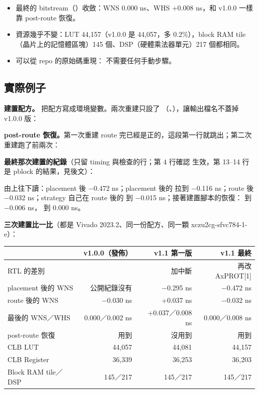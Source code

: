 \begin{gain}
\begin{itemize}
\item 最終的 bitstream（）收斂：WNS 0.000 ns、WHS +0.008 ns，和 v1.0.0 一樣靠 post-route 恢復。
\item 資源幾乎不變：LUT 44,157（v1.0.0 是 44,057，多 0.2\%），block RAM tile（晶片上的記憶體區塊）145 個、DSP（硬體乘法器單元）217 個都相同。
\item 可以從 repo 的原始碼重現： 不需要任何手動步驟。
\end{itemize}
\end{gain}

\subsection{實際例子}

\textbf{建置配方。} 把配方寫成環境變數。兩次重建只設了 （、），讓輸出檔名不蓋掉 v1.0.0 版：


\textbf{post-route 恢復。}第一次重建 route 完已經是正的，這段第一行就跳出；第二次重建跑了前兩次：


\textbf{最終那次建置的紀錄}（只留 timing 與檢查的行；第 4 行確認  生效，第 13--14 行是 pblock 的結果，見後文）：


由上往下讀：placement 後 $-$0.472 ns；placement 後的  拉到 $-$0.116 ns；route 後 $-$0.032 ns；strategy 自己在 route 後的  到 $-$0.015 ns；接著建置腳本的恢復： 到 $-$0.006 ns， 到 0.000 ns。

\textbf{三次建置比一比}（都是 Vivado 2023.2、同一份配方、同一顆 xczu2cg-sfvc784-1-e）：

\begin{center}
\small
\begin{tabularx}{\textwidth}{X r r r}
\toprule
 & v1.0.0（發佈） & v1.1 第一版 & v1.1 最終 \\
\midrule
RTL 的差別 & & 加中斷 & 再改 AxPROT[1] \\
placement 後的 WNS & 公開紀錄沒有 & $-$0.295 ns & $-$0.472 ns \\
route 後的 WNS & $-$0.030 ns & +0.037 ns & $-$0.032 ns \\
最後的 WNS／WHS & 0.000／0.002 ns & +0.037／0.008 ns & 0.000／0.008 ns \\
post-route 恢復 & 用到 & 沒用到 & 用到 \\
CLB LUT & 44,057 & 44,081 & 44,157 \\
CLB Register & 36,339 & 36,253 & 36,203 \\
Block RAM tile／DSP & 145／217 & 145／217 & 145／217 \\
\bottomrule
\end{tabularx}
\end{center}

